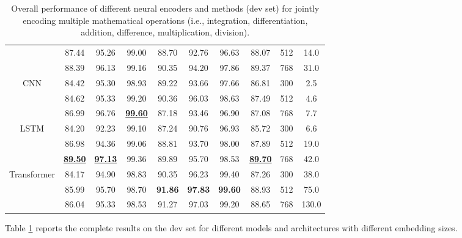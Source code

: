 \documentclass[11pt]{article}
\begin{document}
\begin{table}[th]
\begin{tabular}{c|ccc|ccc|c|cc}
       & 87.44 & 95.26 & 99.00 & 88.70 & 92.76 & 96.63 & 88.07 & 512 & 14.0\\
       & 88.39 & 96.13 & 99.16 & 90.35 & 94.20 & 97.86 & 89.37 & 768 & 31.0\\
        \midrule
       CNN& 84.42 & 95.30 & 98.93 & 89.22 & 93.66 & 97.66 & 86.81 & 300 & 2.5\\
       & 84.62 & 95.33 & 99.20 & 90.36 & 96.03 & 98.63 & 87.49 & 512 & 4.6\\
       & 86.99 & 96.76 & \underline{\textbf{99.60}} & 87.18 & 93.46 & 96.90 & 87.08 & 768 & 7.7\\
       LSTM & 84.20 & 92.23 & 99.10 & 87.24 & 90.76 & 96.93 & 85.72 & 300 & 6.6\\
       & 86.98 & 94.36 & 99.06 & 88.81 & 93.70 & 98.00 & 87.89 & 512 & 19.0\\
       & \underline{\textbf{89.50}} & \underline{\textbf{97.13}} & 99.36 & 89.89 & 95.70 & 98.53 & \underline{\textbf{89.70}} & 768 & 42.0\\
       Transformer& 84.17 & 94.90 & 98.83 & 90.35 & 96.23 & 99.40 & 87.26 & 300 & 38.0\\
       & 85.99  & 95.70 &  98.70 &  \textbf{91.86}  &  \textbf{97.83} & \textbf{99.60} &  88.93  & 512 & 75.0\\
       & 86.04 & 95.33 & 98.53 & 91.27 & 97.03 & 99.20 & 88.65 & 768 & 130.0\\
       \bottomrule
        \end{tabular}
    \caption{Overall performance of different neural encoders and methods (dev set) for jointly encoding multiple mathematical operations (i.e., integration, differentiation, addition, difference, multiplication, division).}
    \label{tab:compare_approaches_overall_dev}
\end{table}

Table \ref{tab:compare_approaches_overall_dev} reports the complete results on the dev set for different models and architectures with different embedding sizes.
\end{document}
